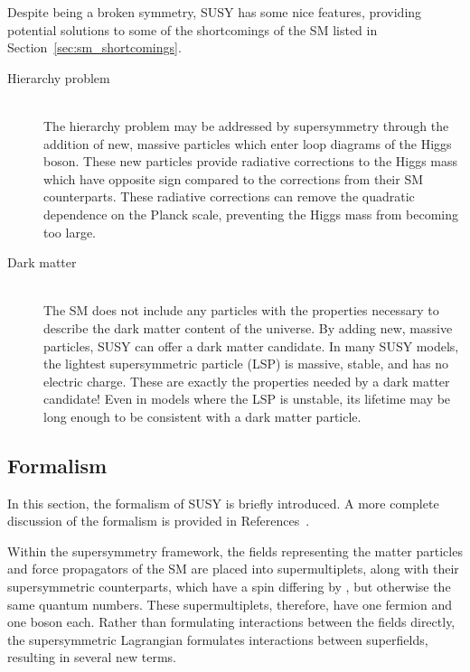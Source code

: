 Despite being a broken symmetry, SUSY has some nice features, providing
potential solutions to some of the shortcomings of the SM listed in
Section~\ref{sec:sm_shortcomings}.
\begin{description}
  \item[Hierarchy problem] \hfill \\
    The hierarchy problem may be addressed by
    supersymmetry through the addition of new, massive particles which enter
    loop diagrams of the Higgs boson.
    These new particles provide radiative corrections to the Higgs mass which
    have opposite sign compared to the corrections from their SM counterparts.
    These radiative corrections can remove the quadratic dependence on the
    Planck scale, preventing the Higgs mass from becoming too large.
  \item[Dark matter] \hfill \\
    The SM does not include any particles with the
    properties necessary to describe the dark matter content of the universe.
    By adding new, massive particles, SUSY can offer a dark matter candidate.
    In many SUSY models, the lightest supersymmetric particle (LSP) is massive,
    stable, and has no electric charge.
    These are exactly the properties needed by a dark matter candidate!
    Even in models where the LSP is unstable, its lifetime may be long enough
    to be consistent with a dark matter particle.
\end{description}

\FloatBarrier
\subsection{Formalism}
\label{sec:susy_formalism}
In this section, the formalism of SUSY is briefly introduced.
A more complete discussion of the formalism is provided in
References~\cite{aitchison2007supersymmetry,Martin:1997ns,Polonsky:2001pn}.

Within the supersymmetry framework, the fields representing the matter
particles and force propagators of the SM are placed into supermultiplets,
along with their supersymmetric counterparts, which have a spin differing
by , but otherwise the same quantum numbers.
These supermultiplets, therefore, have one fermion and one boson each.
Rather than formulating interactions between the fields directly, the
supersymmetric Lagrangian formulates interactions between superfields,
resulting in several new terms.

